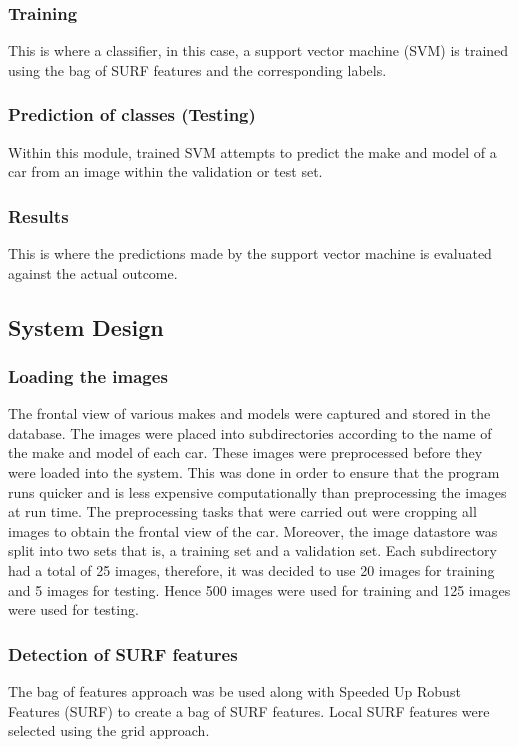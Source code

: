 \documentclass[a4paper, 12pt]{article}
\begin{document}
\subsubsection{Training}
This is where a classifier, in this case, a support vector machine (SVM) is trained using the bag of SURF features and the corresponding labels. 

\subsubsection{Prediction of classes (Testing)}
Within this module, trained SVM attempts to predict the make and model of a car from an image within the validation or test set.

\subsubsection{Results}
This is where the predictions made by the support vector machine is evaluated against the actual outcome. 

\subsection{System Design}

\subsubsection{Loading the images}
The frontal view of various makes and models were captured and stored in the database. The images were placed into subdirectories according to the name of the make and model of each car. These images were preprocessed before they were loaded into the system. This was done in order to ensure that the program runs quicker and is less expensive computationally than preprocessing the images at run time. The preprocessing tasks that were carried out were cropping all images to obtain the frontal view of the car. Moreover, the image datastore was split into two sets that is, a training set and a validation set. Each subdirectory had a total of 25 images, therefore, it was decided to use 20 images for training and 5 images for testing. Hence 500 images were used for training and 125 images were used for testing. 

\subsubsection{Detection of SURF features} 
The bag of features approach was be used along with Speeded Up Robust Features (SURF) to create a bag of SURF features. Local SURF features were selected using the grid approach. 
\end{document}
